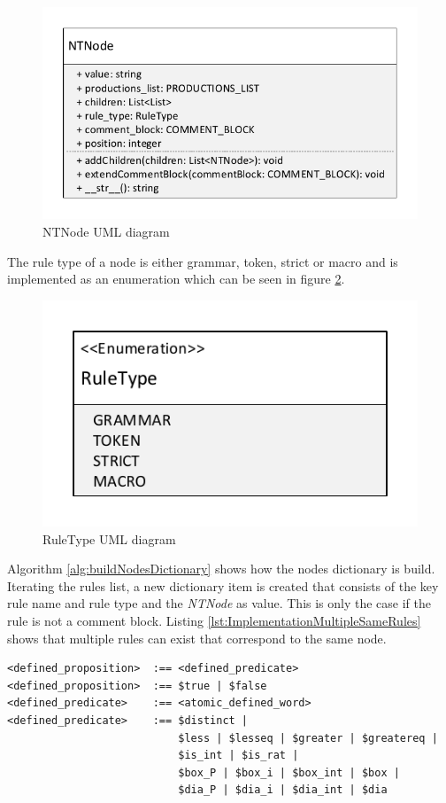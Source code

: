 \begin{figure}[H]
\centering
\includegraphics[width=1\textwidth]{images/uml_data_types_NTNode.pdf}
\caption{NTNode UML diagram}
\label{fig:ImplementationNTNodeUML}
\end{figure}

The rule type of a node is either grammar, token, strict or macro and is implemented as an enumeration which can be seen in figure \ref{fig:ImplementationRuleTypeUML}. 

\begin{figure}[H]
\centering
\includegraphics[width=.7\textwidth]{images/uml_data_types_rule_type.pdf}
\caption{RuleType UML diagram}
\label{fig:ImplementationRuleTypeUML}
\end{figure}

Algorithm \ref{alg:buildNodesDictionary} shows how the nodes dictionary is build. Iterating the rules list, a new dictionary item is created that consists of the key rule name and rule type and the \textit{NTNode} as value. This is only the case if the rule is not a comment block. 
Listing \ref{lst:ImplementationMultipleSameRules} shows that multiple rules can exist that correspond to the same node.\\

\begin{lstlisting}[language=None, basicstyle=\scriptsize	,caption= Multiple rules with the same left-hand side of the rule,label= lst:ImplementationMultipleSameRules]
<defined_proposition>  :== <defined_predicate>
<defined_proposition>  :== $true | $false
<defined_predicate>    :== <atomic_defined_word>
<defined_predicate>    :== $distinct |
                           $less | $lesseq | $greater | $greatereq |
                           $is_int | $is_rat |
                           $box_P | $box_i | $box_int | $box |
                           $dia_P | $dia_i | $dia_int | $dia
\end{lstlisting}


